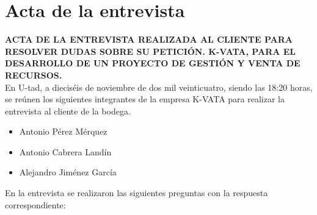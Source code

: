 \chapter{Acta de la entrevista}

\textbf{ACTA DE LA ENTREVISTA REALIZADA AL CLIENTE PARA RESOLVER DUDAS SOBRE SU PETICIÓN. K-VATA, PARA EL DESARROLLO DE UN PROYECTO DE GESTIÓN Y VENTA DE RECURSOS.} \\

En U-tad, a dieciséis de noviembre de dos mil veinticuatro, siendo las 18:20 horas, se reúnen los siguientes integrantes de la empresa K-VATA para realizar la entrevista al cliente de la bodega.

\begin{itemize}
    \item Antonio Pérez Mérquez
    \item Antonio Cabrera Landín
    \item Alejandro Jiménez García
\end{itemize}

En la entrevista se realizaron las siguientes preguntas con la respuesta correspondiente:

